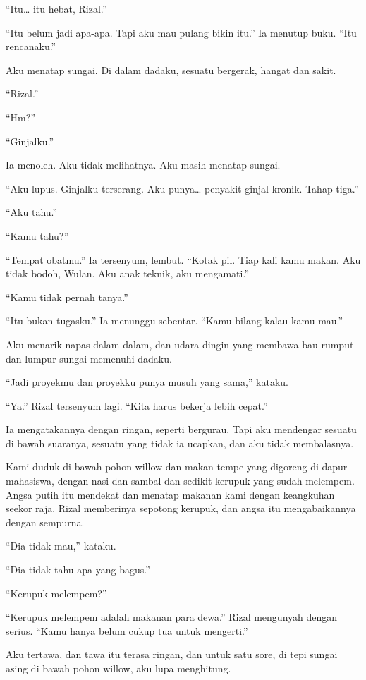 \documentclass[11pt,twoside,openany]{book}
\begin{document}
``Itu\ldots{} itu hebat, Rizal.''

``Itu belum jadi apa-apa. Tapi aku mau pulang bikin itu.'' Ia menutup buku. ``Itu rencanaku.''

Aku menatap sungai. Di dalam dadaku, sesuatu bergerak, hangat dan sakit.

``Rizal.''

``Hm?''

``Ginjalku.''

Ia menoleh. Aku tidak melihatnya. Aku masih menatap sungai.

``Aku lupus. Ginjalku terserang. Aku punya\ldots{} penyakit ginjal kronik. Tahap tiga.''

``Aku tahu.''

``Kamu tahu?''

``Tempat obatmu.'' Ia tersenyum, lembut. ``Kotak pil. Tiap kali kamu makan. Aku tidak bodoh, Wulan. Aku anak teknik, aku mengamati.''

``Kamu tidak pernah tanya.''

``Itu bukan tugasku.'' Ia menunggu sebentar. ``Kamu bilang kalau kamu mau.''

Aku menarik napas dalam-dalam, dan udara dingin yang membawa bau rumput dan lumpur sungai memenuhi dadaku.

``Jadi proyekmu dan proyekku punya musuh yang sama,'' kataku.

``Ya.'' Rizal tersenyum lagi. ``Kita harus bekerja lebih cepat.''

Ia mengatakannya dengan ringan, seperti bergurau. Tapi aku mendengar sesuatu di bawah suaranya, sesuatu yang tidak ia ucapkan, dan aku tidak membalasnya.

Kami duduk di bawah pohon willow dan makan tempe yang digoreng di dapur mahasiswa, dengan nasi dan sambal dan sedikit kerupuk yang sudah melempem. Angsa putih itu mendekat dan menatap makanan kami dengan keangkuhan seekor raja. Rizal memberinya sepotong kerupuk, dan angsa itu mengabaikannya dengan sempurna.

``Dia tidak mau,'' kataku.

``Dia tidak tahu apa yang bagus.''

``Kerupuk melempem?''

``Kerupuk melempem adalah makanan para dewa.'' Rizal mengunyah dengan serius. ``Kamu hanya belum cukup tua untuk mengerti.''

Aku tertawa, dan tawa itu terasa ringan, dan untuk satu sore, di tepi sungai asing di bawah pohon willow, aku lupa menghitung.
\end{document}
